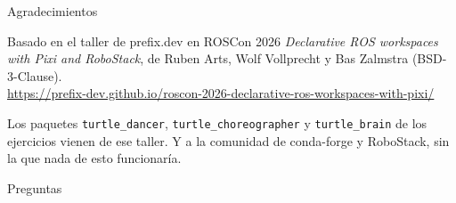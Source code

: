 \documentclass[aspectratio=169]{beamer}
\begin{document}
\begin{frame}{Agradecimientos}
\begin{block}{Basado en el taller de prefix.dev en ROSCon 2026}
\emph{Declarative ROS workspaces with Pixi and RoboStack}, de Ruben Arts, Wolf Vollprecht y Bas Zalmstra (BSD-3-Clause).\\[0.5em]
\small\url{https://prefix-dev.github.io/roscon-2026-declarative-ros-workspaces-with-pixi/}
\end{block}
\vfill
Los paquetes \texttt{turtle\_dancer}, \texttt{turtle\_choreographer} y \texttt{turtle\_brain} de los ejercicios vienen de ese taller.
\vfill
Y a la comunidad de conda-forge y RoboStack, sin la que nada de esto funcionaría.
\end{frame}

\begin{frame}
  \centering
  \Large Preguntas
\end{frame}
\end{document}
